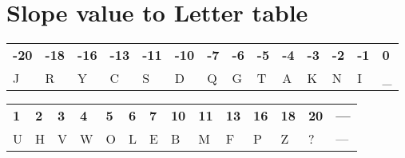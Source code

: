 \documentclass[12pt]{article}
\begin{document}
\section*{Slope value to Letter table}
\noindent %
\begin{tabularx}{\textwidth}{|*{14}{W|}} %
\hline
\textbf{-20} & \textbf{-18} & \textbf{-16} & \textbf{-13} & \textbf{-11} & \textbf{-10} & \textbf{-7} & \textbf{-6} & \textbf{-5} & \textbf{-4} & \textbf{-3} & \textbf{-2} & \textbf{-1} & \textbf{0} \\
J & R & Y & C & S & D & Q & G & T & A & K & N & I & \_ \\
\hline
\end{tabularx}

\vspace{1em} %

\noindent
\begin{tabularx}{\textwidth}{|*{14}{W|}} %
\hline
\textbf{1} & \textbf{2} & \textbf{3} & \textbf{4} & \textbf{5} & \textbf{6} & \textbf{7} & \textbf{10} & \textbf{11} & \textbf{13} & \textbf{16} & \textbf{18} & \textbf{20} & \textbf{---} \\
U & H & V & W & O & L & E & B & M & F & P & Z & ? & --- \\
\hline
\end{tabularx}
\renewcommand{\labelenumi}{\#\arabic{enumi}}
\vspace{10cm}
\end{document}
